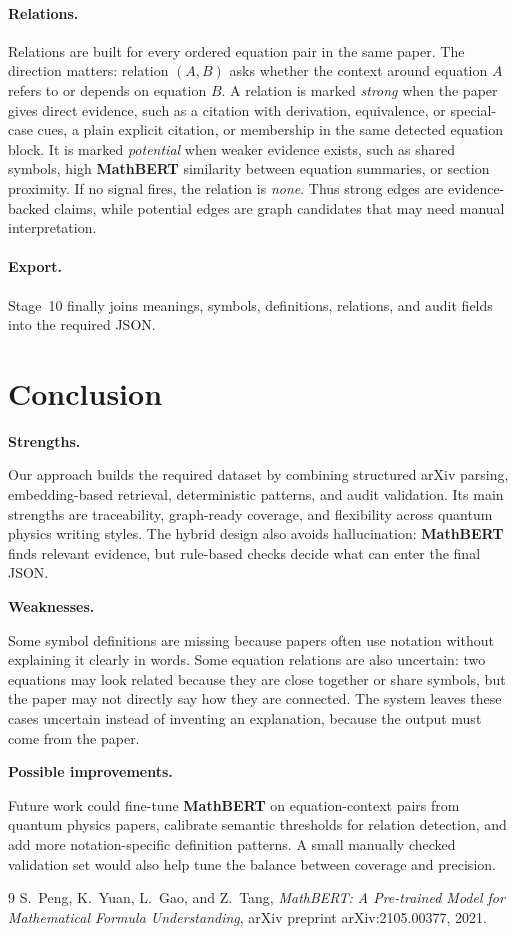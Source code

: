 \documentclass[11pt]{article}
\begin{document}
\paragraph{Relations.}
Relations are built for every ordered equation pair in the same paper.
The direction matters: relation $(A,B)$ asks whether the context around
equation $A$ refers to or depends on equation $B$.  A relation is marked
\textit{strong} when the paper gives direct evidence, such as a citation
with derivation, equivalence, or special-case cues, a plain explicit
citation, or membership in the same detected equation block.  It is
marked \textit{potential} when weaker evidence exists, such as shared
symbols, high \textbf{MathBERT} similarity between equation summaries, or
section proximity.  If no signal fires, the relation is \textit{none}.
Thus strong edges are evidence-backed claims, while potential edges are
graph candidates that may need manual interpretation.

\paragraph{Export.}
Stage~10 finally joins meanings, symbols, definitions, relations, and
audit fields into the required JSON\@.


\section{Conclusion}

\noindent\textbf{Strengths.}

Our approach builds the required dataset by combining structured arXiv
parsing, embedding-based retrieval, deterministic patterns, and audit
validation.  Its main strengths are traceability, graph-ready coverage,
and flexibility across quantum physics writing styles.
The hybrid design also avoids hallucination: \textbf{MathBERT} finds
relevant evidence, but rule-based checks decide what can enter the final
JSON\@.

\noindent\textbf{Weaknesses.}

Some symbol definitions are missing because papers often use notation
without explaining it clearly in words.
Some equation relations are also uncertain: two equations may look
related because they are close together or share symbols, but the paper
may not directly say how they are connected.
The system leaves these cases uncertain instead of inventing an
explanation, because the output must come from the paper.

\noindent\textbf{Possible improvements.}

Future work could fine-tune \textbf{MathBERT} on equation-context pairs
from quantum physics papers, calibrate semantic thresholds for relation
detection, and add more notation-specific definition patterns.  A small
manually checked validation set would also help tune the balance between
coverage and precision.

\begin{thebibliography}{9}
S.~Peng, K.~Yuan, L.~Gao, and Z.~Tang,
\textit{MathBERT\@: A Pre-trained Model for Mathematical Formula Understanding},
arXiv preprint arXiv:2105.00377, 2021.
\end{thebibliography}
\end{document}
